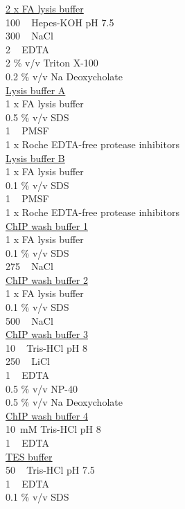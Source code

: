 \underline{2 x FA lysis buffer}\\
100 \si{\milli\Molar} Hepes-KOH pH 7.5\\
300 \si{\milli\Molar} NaCl\\
2 \si{\milli\Molar} EDTA \\
2 \% v/v Triton X-100\\
0.2 \% v/v Na Deoxycholate\\

\underline{Lysis buffer A}\\
1 x FA lysis buffer\\
0.5 \% v/v SDS\\
1 \si{\milli\Molar} PMSF\\
1 x Roche EDTA-free protease inhibitors\\

\underline{Lysis buffer B}\\
1 x FA lysis buffer\\
0.1 \% v/v SDS\\
1 \si{\milli\Molar} PMSF\\
1 x Roche EDTA-free protease inhibitors\\

\underline{ChIP wash buffer 1}\\
1 x FA lysis buffer\\
0.1 \% v/v SDS\\
275 \si{\milli\Molar} NaCl\\

\underline{ChIP wash buffer 2}\\
1 x FA lysis buffer\\
0.1 \% v/v SDS\\
500 \si{\milli\Molar} NaCl\\

\underline{ChIP wash buffer 3}\\
10 \si{\milli\Molar} Tris-HCl pH 8\\
250 \si{\milli\Molar} LiCl\\
1 \si{\milli\Molar} EDTA\\
0.5 \% v/v NP-40\\
0.5 \% v/v Na Deoxycholate\\

\underline{ChIP wash buffer 4}\\
10\si{\milli\Molar}mM Tris-HCl pH 8\\
1 \si{\milli\Molar} EDTA\\

\underline{TES buffer}\\
50 \si{\milli\Molar} Tris-HCl pH 7.5\\
1 \si{\milli\Molar} EDTA \\
0.1 \% v/v SDS\\


